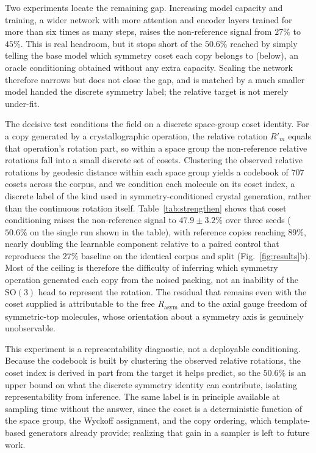 \documentclass[11pt]{article}
\begin{document}
Two experiments locate the remaining gap. Increasing model capacity and
training, a wider network with more attention and encoder layers trained for more
than six times as many steps, raises the non-reference signal from $27\%$ to
$45\%$. This is real headroom, but it stops short of the $50.6\%$ reached by simply
telling the base model which symmetry coset each copy belongs to (below), an
oracle conditioning obtained without any extra capacity. Scaling the network
therefore narrows but does not close the gap, and is matched by a much smaller
model handed the discrete symmetry label; the relative target is not merely
under-fit.

The decisive test conditions the field on a discrete space-group coset identity.
For a copy generated by a crystallographic operation, the relative rotation
$R'_m$ equals that operation's rotation part, so within a space group the
non-reference relative rotations fall into a small discrete set of cosets.
Clustering the observed relative rotations by geodesic distance within each space
group yields a codebook of $707$ cosets across the corpus, and we condition each
molecule on its coset index, a discrete label of the kind used in
symmetry-conditioned crystal
generation\cite{jiao2024diffcsppp,wyckoffdiff2025,symmcd2025}, rather than the
continuous rotation itself. Table~\ref{tab:strengthen} shows that coset
conditioning raises the non-reference signal to $47.9\pm3.2\%$ over three seeds
($50.6\%$ on the single run shown in the table), with reference copies
reaching $89\%$, nearly doubling the learnable component relative to a paired
control that reproduces the $27\%$ baseline on the identical corpus and split
(Fig.~\ref{fig:results}b). Most of the ceiling is therefore the difficulty of
inferring which symmetry
operation generated each copy from the noised packing, not an inability of the
$\mathrm{SO}(3)$ head to represent the rotation. The residual that remains even
with the coset supplied is attributable to the free $R_{\text{asym}}$ and to the
axial gauge freedom of symmetric-top molecules, whose orientation about a
symmetry axis is genuinely unobservable.

This experiment is a representability diagnostic, not a deployable conditioning.
Because the codebook is built by clustering the observed relative rotations, the
coset index is derived in part from the target it helps predict, so the $50.6\%$ is
an upper bound on what the discrete symmetry identity can contribute, isolating
representability from inference. The same label is in principle available at
sampling time without the answer, since the coset is a deterministic function of
the space group, the Wyckoff assignment, and the copy ordering, which
template-based generators already provide\cite{jiao2024diffcsppp,wyckoffdiff2025,symmcd2025};
realizing that gain in a sampler is left to future work.
\end{document}
